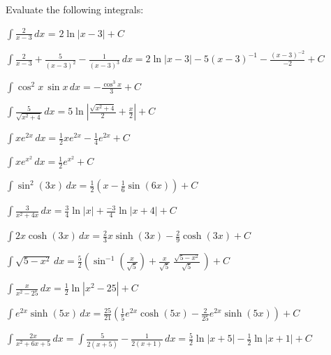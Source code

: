 \documentclass[12pt]{exam}
\begin{document}
Evaluate the following integrals:
\begin{questions}
\question  $\displaystyle \int \frac{2}{x-3}    \, dx$ = $2\ln|x-3| +C$ 
\vspace{.35in}

\question $\displaystyle \int \frac{2}{x-3} + \frac {5}{(x-3)^2} 
- \frac{1}{(x-3)^3}    \, dx = 2\ln|x-3| -5(x-3)^{-1}
-\frac{(x-3)^{-2}}{-2}+C$
\vspace{.35in}

\question $\displaystyle \int  \cos^2 x \, \sin x \, dx = -\frac{\cos^3 x}{3}+C$
\vspace{.35in}

\question $\displaystyle \int \frac{5}{\sqrt{x^2 +4}} \, dx = 5\ln\left|
\frac{\sqrt{x^2+4}}{2} + \frac{x}{2}\right| +C$
\vspace{.35in}

\question $\int x e^{2x} \, dx = \frac{1}{2} xe^{2x} -\frac{1}{4}e^{2x}+C$
\vspace{.35in}

\question $\int x e^{x^2} \, dx =\frac{1}{2} e^{x^2}+C$
\vspace{.35in}


\question $\int \sin^2(3x)\, dx =\frac{1}{2}\left(x-\frac{1}{6}\sin(6x)\right)+C$
\vspace{.35in}

\question $\displaystyle \int  \frac{3}{x^2+4x} \, dx = \frac{3}{4}\ln|x|
+\frac{-3}{4}\ln|x+4|+C$
\vspace{.35in}

\question $\displaystyle \int  2x\cosh(3x) \, dx =\frac{2}{3}x\sinh(3x) -
\frac{2}{9}\cosh(3x)+C$
\vspace{.25in}

\question $\displaystyle \int   \sqrt{5-x^2} \, dx=\frac{5}{2}\left(
\sin^{-1}\left(\frac{x}{\sqrt{5}}\right) + \frac{x}{\sqrt{5}}\;\frac{\sqrt{5-x^2}}
{\sqrt{5}}\,\right)+C$
\vspace{.25in}

\question $\displaystyle \int \frac{x}{x^2-25}\, dx=\frac{1}{2}\ln|x^2-25|+C$
\vspace{.35in}

\question $\displaystyle \int e^{2x} \sinh(5x)\, dx =
\frac{25}{21}\left(\frac{1}{5}e^{2x}\cosh(5x)-\frac{2}{25}e^{2x}\sinh(5x)
\right)+C$
\vspace{.25in}

\question $\displaystyle \int   \frac{2x}{x^2+6x+5}\, dx = \int \frac{5}{2(x+5)}-
\frac{1}{2(x+1)}\, dx = \frac{5}{2}\ln|x+5| -\frac{1}{2}\ln|x+1|+C$
\vspace{.35in}


\end{questions}
\end{document}
